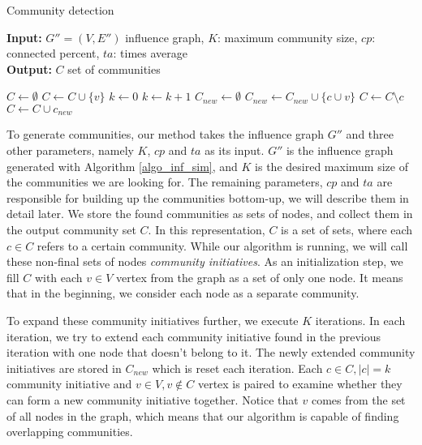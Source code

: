 \documentclass[pdflatex,sn-mathphys-num]{sn-jnl}
\begin{document}
\begin{algorithm}[ht]
\caption{Community detection}
\label{algo_comm_det}
\textbf{Input:} $G'' = (V,E'')$ influence graph, $K$: maximum community size, $cp$: connected percent, $ta$: times average
\\
\textbf{Output:} $C$ set of communities
\begin{algorithmic}[1]
    \State $C \gets \emptyset$
        \State $C \gets C \cup \{v\}$
    \EndFor
    \State $k \gets 0$
        \State $k \gets k + 1$
        \State $C_{new} \gets \emptyset$
                \State $C_{new} \gets C_{new} \cup \{c \cup v\}$
            \EndIf
        \EndFor
                \State $C \gets C \setminus c$
            \EndIf
        \EndFor
            \State $C \gets C \cup c_{new}$
        \EndFor
    \EndWhile
\end{algorithmic}
\end{algorithm}

To generate communities, our method takes the influence graph $G''$ and three other parameters, namely $K$, $cp$ and $ta$ as its input. $G''$ is the influence graph generated with Algorithm \ref{algo_inf_sim}, and $K$ is the desired maximum size of the communities we are looking for. The remaining parameters, $cp$ and $ta$ are responsible for building up the communities bottom-up, we will describe them in detail later.
We store the found communities as sets of nodes, and collect them in the output community set $C$. In this representation, $C$ is a set of sets, where each $c \in C$ refers to a certain community. While our algorithm is running, we will call these non-final sets of nodes \textit{community initiatives}. As an initialization step, we fill $C$ with each $v \in V$ vertex from the graph as a set of only one node. It means that in the beginning, we consider each node as a separate community.

To expand these community initiatives further, we execute $K$ iterations. In each iteration, we try to extend each community initiative found in the previous iteration with one node that doesn't belong to it. The newly extended community initiatives are stored in $C_{new}$ which is reset each iteration. Each $c \in C, |c|=k$ community initiative and $v \in V, v \notin C$ vertex is paired to examine whether they can form a new community initiative together. Notice that $v$ comes from the set of all nodes in the graph, which means that our algorithm is capable of finding overlapping communities.
\end{document}
